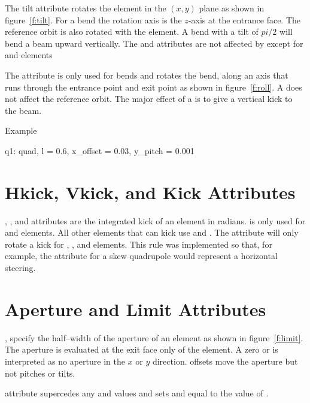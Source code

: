 The tilt attribute rotates the element in the $(x, y)$ plane as
shown in figure~\ref{f:tilt}. For a bend the rotation axis is the
$z$-axis at the entrance face. The reference orbit is also rotated
with the element. A bend with a tilt of $pi/2$ will bend a beam
upward vertically. The  and  attributes are
not affected by  except for  and 
elements


The  attribute is only used for bends
and rotates the bend, along an axis that runs through the entrance
point and exit point as shown in figure~\ref{f:roll}. A  
does not affect the reference orbit. The major effect of a 
is to give a vertical kick to the beam.

\noindent
Example
\begin{example}
  q1: quad, l = 0.6, x_offset = 0.03, y_pitch = 0.001
\end{example}

\section{Hkick, Vkick, and Kick Attributes}
\label{s:kick}

, , and  attributes are the integrated
kick of an element in radians.  is only used for 
and  elements. All other elements that can kick use 
 and . The  attribute will only rotate
a kick for , ,  and 
elements. This rule was implemented so that, for example, the 
 attribute for a skew quadrupole
would represent a horizontal steering.

\section{Aperture and Limit Attributes}
\label{s:limit}

,  specify the half--width of the 
aperture of an element as shown in figure~\ref{f:limit}. 
The aperture is evaluated at the exit
face only of the element. A zero  or 
is interpreted as no aperture in the $x$ or $y$ direction.
offsets move the aperture but not pitches or tilts.

 attribute supercedes
any  and  values and sets  and
 equal to the value of .

